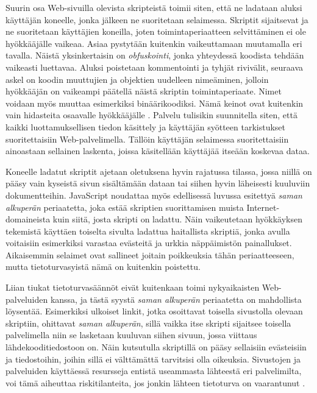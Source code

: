 Suurin osa Web-sivuilla olevista skripteistä toimii siten, että ne ladataan aluksi käyttäjän koneelle, jonka jälkeen ne suoritetaan selaimessa. Skriptit sijaitsevat ja ne suoritetaan 
käyttäjien koneilla, joten toimintaperiaatteen selvittäminen ei ole hyökkääjälle vaikeaa. Asiaa pystytään kuitenkin vaikeuttamaan muutamalla eri tavalla. Näistä yksinkertaisin on 
\emph{obfuskointi}, jonka yhteydessä koodista tehdään vaikeasti luettavaa. Aluksi poistetaan kommentointi ja tyhjät rivivälit, seuraava askel on koodin muuttujien ja objektien
uudelleen nimeäminen, jolloin hyökkääjän on vaikeampi päätellä näistä skriptin toimintaperiaate. Nimet voidaan myös muuttaa esimerkiksi binäärikoodiksi. Nämä keinot ovat kuitenkin 
vain hidasteita osaavalle hyökkääjälle \cite{AJAX}. Palvelu tulisikin suunnitella siten, että kaikki luottamuksellisen tiedon käsittely ja käyttäjän syötteen tarkistukset suoritettaisiin
Web-palvelimella. Tällöin käyttäjän selaimessa suoritettaisiin ainoastaan sellainen laskenta, joissa käsitellään käyttäjää itseään koskevaa dataa.

Koneelle ladatut skriptit ajetaan oletuksena hyvin rajatussa tilassa, jossa niillä on pääsy vain kyseistä sivun sisältämään dataan tai siihen hyvin läheisesti kuuluviin dokumentteihin. 
JavaScript noudattaa myös  edellisessä luvussa esitettyä \emph{saman alkuperän} periaatetta, joka estää skriptien suorittamisen muista Internet-domaineista kuin siitä, josta skripti on
ladattu. Näin vaikeutetaan hyökkäyksen tekemistä käyttäen toiselta sivulta ladattua haitallista skriptiä, jonka avulla voitaisiin esimerkiksi varastaa evästeitä ja urkkia näppäimistön
painallukset.  Aikaisemmin selaimet ovat sallineet joitain poikkeuksia tähän periaatteeseen, mutta tietoturvasyistä nämä on kuitenkin poistettu.

Liian tiukat tietoturvasäännöt eivät 
kuitenkaan toimi nykyaikaisten Web-\-palveluiden kanssa, ja tästä syystä \emph{saman alkuperän} periaatetta on mahdollista löysentää. Esimerkiksi ulkoiset linkit, jotka osoittavat toisella
sivustolla olevaan skriptiin, ohittavat \emph{saman alkuperän}, sillä vaikka itse skripti sijaitsee toisella palvelimella niin se lasketaan kuuluvan siihen sivuun, jossa viittaus
lähdekooditiedostoon on.  Näin kutsutulla skriptillä on pääsy sellaisiin evästeisiin ja tiedostoihin, joihin sillä ei välttämättä tarvitsisi olla oikeuksia. Sivustojen ja palveluiden 
käyttäessä resursseja entistä useammasta lähteestä eri palvelimilta, voi tämä aiheuttaa riskitilanteita, jos jonkin lähteen tietoturva on vaarantunut \cite{AJAX}.

